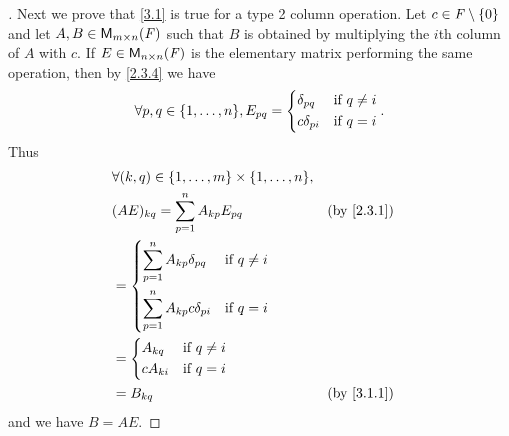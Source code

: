 \begin{proof}[]
  Next we prove that \cref{3.1} is true for a type 2 column operation.
  Let \(c \in \mathit{F} \setminus \left\lbrace0\right\rbrace\) and let \(A, B \in \ms\) such that \(B\) is obtained by multiplying the \(i\)th column of \(A\) with \(c\).
  If \(E \in \ms[n][n][\F]\) is the elementary matrix performing the same operation, then by \cref{2.3.4} we have
  \[
    \forall p, q \in \set{1, \dots, n}, E_{p q} = \begin{dcases}
      \delta_{p q}   & \text{if } q \neq i \\
      c \delta_{p i} & \text{if } q = i
    \end{dcases}.
  \]
  Thus
  \begin{align*}
     & \forall (k, q) \in \set{1, \dots, m} \times \set{1, \dots, n},                 \\
     & (AE)_{k q} = \sum_{p = 1}^n A_{k p} E_{p q}                    &  & \by{2.3.1} \\
     & = \begin{dcases}
           \sum_{p = 1}^n A_{k p} \delta_{p q}   & \text{if } q \neq i \\
           \sum_{p = 1}^n A_{k p} c \delta_{p i} & \text{if } q = i
         \end{dcases}                  \\
     & = \begin{dcases}
           A_{k q}   & \text{if } q \neq i \\
           c A_{k i} & \text{if } q = i
         \end{dcases}                                              \\
     & = B_{k q}                                                      &  & \by{3.1.1}
  \end{align*}
  and we have \(B = AE\).


\end{proof}
